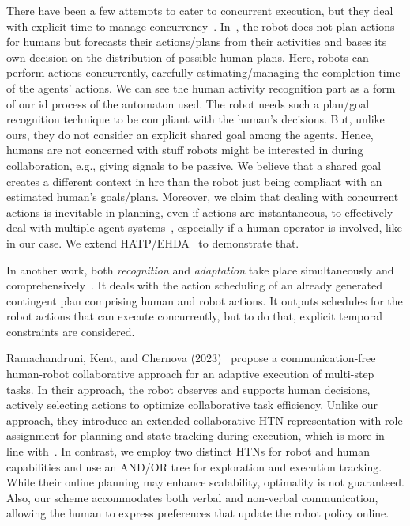 There have been a few attempts to cater to concurrent execution, but they deal with explicit time to manage concurrency~\cite{CirilloKS09a,kockemann2014grandpa}. 
In~\cite{CirilloKS09}, the robot does not plan actions for humans but forecasts their actions/plans from their activities and bases its own decision on the distribution of possible human plans. Here, robots can perform actions concurrently, carefully estimating/managing the completion time of the agents' actions. 
We can see the human activity recognition part as a form of our \acrfull{id} process of the automaton used. The robot needs such a plan/goal recognition technique to be compliant with the human's decisions. 
But, unlike ours, they do not consider an explicit shared goal among the agents. Hence, humans are not concerned with stuff robots might be interested in during collaboration, e.g., giving signals to be passive. 
We believe that a shared goal creates a different context in \acrshort{hrc} than the robot just being compliant with an estimated human's goals/plans. 
Moreover, we claim that dealing with concurrent actions is inevitable in planning, even if actions are instantaneous, to effectively deal with multiple agent systems~\cite{CrosbyJR14,ShekharB20}, especially if a human operator is involved, like in our case. 
We extend HATP/EHDA~\cite{buisan_hatpehda_icra} to demonstrate that.

In another work, both \textit{recognition} and \textit{adaptation} take place simultaneously and comprehensively~\cite{levine2014concurrent}. 
It deals with the action scheduling of an already generated contingent plan comprising human and robot actions. 
It outputs schedules for the robot actions that can execute concurrently, but to do that, explicit temporal constraints are considered. 

Ramachandruni, Kent, and Chernova (2023)~\cite{RAMACHANDRUNI2023} propose a communication-free human-robot collaborative approach for an adaptive execution of multi-step tasks. 
In their approach, the robot observes and supports human decisions, actively selecting actions to optimize collaborative task efficiency. 
Unlike our approach, they introduce an extended collaborative HTN representation with role assignment for planning and state tracking during execution, which is more in line with~\cite{roncone2017transparent}. 
In contrast, we employ two distinct HTNs for robot and human capabilities and use an AND/OR tree for exploration and execution tracking. While their online planning may enhance scalability, optimality is not guaranteed. 
Also, our scheme accommodates both verbal and non-verbal communication, allowing the human to express preferences that update the robot policy online. 

